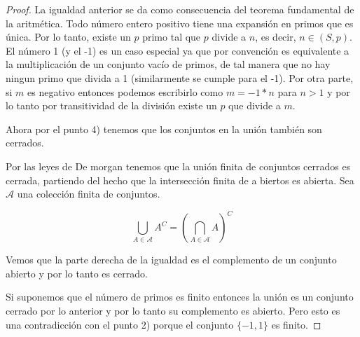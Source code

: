 \documentclass[letter,twoside,12pt]{article}
\begin{document}
\begin{enumerate}[label=\textbf{\arabic*}.]
\begin{proof}
La igualdad anterior se da como consecuencia del teorema fundamental de la aritm\'etica. Todo n\'umero entero positivo tiene una expansi\'on en primos que es \'unica. Por lo tanto, existe un $p$ primo tal que $p$ divide a $n$, es decir, $n \in (S,p)$. El n\'umero 1 (y el -1) es un caso especial ya que por convenci\'on es equivalente a la multiplicaci\'on de un conjunto vac\'io de primos, de tal manera que no hay ningun primo que divida a 1 (similarmente se cumple para el -1). Por otra parte, si $m$ es negativo entonces podemos escribirlo como $m=-1*n$ para $n>1$ y por lo tanto por transitividad de la divisi\'on existe un $p$ que divide a $m$. 

Ahora por el punto 4) tenemos que los conjuntos en la uni\'on tambi\'en son cerrados.

Por las leyes de De morgan tenemos que la uni\'on finita de conjuntos cerrados es cerrada, partiendo del hecho que la intersecci\'on finita de a biertos es abierta. Sea $\mathcal{A}$ una colecci\'on finita de conjuntos.

\begin{equation}
\bigcup_{A\in\mathcal{A}} A^C=(\bigcap_{A\in\mathcal{A}} A)^C \nonumber
\end{equation}

Vemos que la parte derecha de la igualdad es el complemento de un conjunto abierto y por lo tanto es cerrado.

Si suponemos que el n\'umero de primos es finito entonces la uni\'on es un conjunto cerrado por lo anterior y por lo tanto su complemento es abierto. Pero esto es una contradicci\'on con el punto 2) porque el conjunto $\{-1,1\}$ es finito.
\end{proof}
\end{enumerate}
\end{document}
